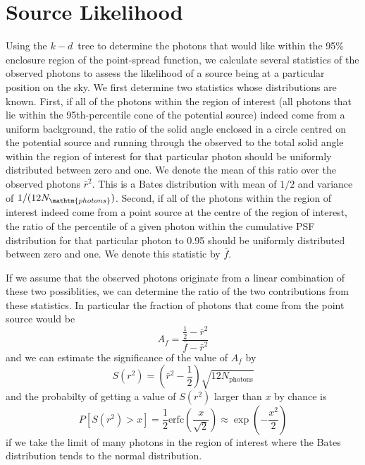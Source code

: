 \documentclass[useAMS,usenatbib]{mn2e}
\begin{document}
\section{Source Likelihood}

Using the $k-d$~tree to determine the photons that would like within
the 95\% enclosure region of the point-spread function, we calculate
several statistics of the observed photons to assess the likelihood of
a source being at a particular position on the sky.  We first
determine two statistics whose distributions are known. First, if all
of the photons within the region of interest (all photons that lie
within the 95th-percentile cone of the potential source) indeed come
from a uniform background, the ratio of the solid angle enclosed in a
circle centred on the potential source and running through the
observed to the total solid angle within the region of interest for
that particular photon should be uniformly distributed between zero
and one.  We denote the mean of this ratio over the observed photons
$\bar r^2$.  This is a Bates distribution with mean of $1/2$ and
variance of $1/(12 N_\mathtm{photons})$.  Second, if all of the photons within the
region of interest indeed come from a point source at the centre of
the region of interest, the ratio of the percentile of a given photon
within the cumulative PSF distribution for that particular photon to
0.95 should be uniformly distributed between zero and one.  We denote
this statistic by $\bar f$.

If we assume that the observed photons originate from a linear
combination of these two possiblities, we can determine the ratio of
the two contributions from these statistics. In particular the fraction
of photons that come from the point source would be
\begin{equation}
  A_f=\frac{\frac{1}{2}-\bar r^2}{\bar f-\bar r^2}
  \label{eq:1}
\end{equation}
and we can estimate the significance of the value of $A_f$ by
\begin{equation}
  S(r^2) = \left ( \bar r^2-\frac{1}{2} \right ) \sqrt{12 N_\mathrm{photons}}
\end{equation}
and the probabilty of getting a value of $S(r^2)$ larger than $x$ by
chance is
\begin{equation}
  P\left [ S(r^2) > x \right ] = \frac{1}{2} \mathrm{erfc} \left ( \frac{x}{\sqrt{2}} \right
    ) \approx \exp \left (-\frac{x^2}{2} \right )
\end{equation}
if we take the limit of many photons in the region of interest where
the Bates distribution tends to the normal distribution.  
\end{document}
